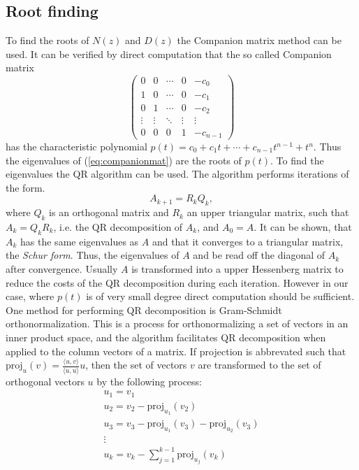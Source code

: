 \documentclass[10pt]{amsart}
\begin{document}
\subsection{Root finding}
To find the roots of $N(z)$ and $D(z)$ the Companion matrix method can be used. It can be verified by direct computation that the so called Companion matrix
\begin{equation}
\left(\begin{array}{ccccc}0 & 0 & \cdots & 0 & -c_0 \\1 & 0 & \cdots & 0 & -c_1 \\0 & 1 & \cdots & 0 & -c_2 \\\vdots & \vdots & \ddots & \vdots & \vdots \\0 & 0 & 0 & 1 & -c_{n-1}\end{array}\right)
\label{eq:companionmat}
\end{equation}
has the characteristic polynomial $p(t)=c_0+c_1 t + \cdots + c_{n-1} t^{n-1} + t^n$. Thus the eigenvalues of (\ref{eq:companionmat}) are the roots of $p(t)$. To find the eigenvalues the QR algorithm can  be used. The algorithm performs iterations of the form. 
$$A_{k+1} = R_{k} Q_{k},$$ 
where $Q_k$ is an orthogonal matrix and $R_k$ an upper triangular matrix, such that $A_k = Q_k R_k$, i.e. the QR decomposition of $A_k$, and $A_0=A$. It can be shown, that $A_k$ has the same eigenvalues as $A$ and that it converges to a triangular matrix, the {\it Schur form}.  Thus, the eigenvalues of $A$ and be read off the diagonal of $A_k$ after convergence. Usually $A$ is transformed into a upper Hessenberg matrix to reduce the costs of the QR decomposition during each iteration. However in our case, where $p(t)$ is of very small degree direct computation should be sufficient. One method for performing QR decomposition is Gram-Schmidt orthonormalization. This is a process for orthonormalizing a set of vectors in an inner product space, and the algorithm facilitates QR decomposition when applied to the column vectors of a matrix. If projection is abbrevated such that $\mathrm{proj}_u(v)=\frac{\langle u,v \rangle}{\langle u,u \rangle}u$, then the set of vectors $v$ are transformed to the set of orthogonal vectors $u$ by the following process:
$$\begin{array}{l}
u_1=v_1\\
u_2=v_2-\mathrm{proj}_{u_1}(v_2)\\
u_3=v_3-\mathrm{proj}_{u_1}(v_3)-\mathrm{proj}_{u_2}(v_3)\\
\vdots\\
u_k=v_k-\sum_{j=1}^{k-1}\mathrm{proj}_{u_j}(v_k)\\
\end{array}$$
\end{document}
